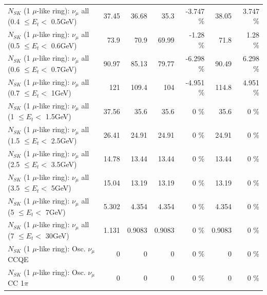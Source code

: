 \begin{table}
\begin{tabular}{| l | r | r | r  r | r  r |}
       $N_{SK}$ (1 $\mu$-like ring): $\nu_{\mu}$ all (0.4 $\leq E_{t} <$ 0.5GeV) &           37.45 &           36.68 &            35.3 &   -3.747 \%  &           38.05 &    3.747 \%  \\ 
       $N_{SK}$ (1 $\mu$-like ring): $\nu_{\mu}$ all (0.5 $\leq E_{t} <$ 0.6GeV) &            73.9 &            70.9 &           69.99 &    -1.28 \%  &            71.8 &     1.28 \%  \\ 
       $N_{SK}$ (1 $\mu$-like ring): $\nu_{\mu}$ all (0.6 $\leq E_{t} <$ 0.7GeV) &           90.97 &           85.13 &           79.77 &   -6.298 \%  &           90.49 &    6.298 \%  \\ 
         $N_{SK}$ (1 $\mu$-like ring): $\nu_{\mu}$ all (0.7 $\leq E_{t} <$ 1GeV) &             121 &           109.4 &             104 &   -4.951 \%  &           114.8 &    4.951 \%  \\ 
         $N_{SK}$ (1 $\mu$-like ring): $\nu_{\mu}$ all (1 $\leq E_{t} <$ 1.5GeV) &           37.56 &            35.6 &            35.6 &        0 \%  &            35.6 &        0 \%  \\ 
       $N_{SK}$ (1 $\mu$-like ring): $\nu_{\mu}$ all (1.5 $\leq E_{t} <$ 2.5GeV) &           26.41 &           24.91 &           24.91 &        0 \%  &           24.91 &        0 \%  \\ 
       $N_{SK}$ (1 $\mu$-like ring): $\nu_{\mu}$ all (2.5 $\leq E_{t} <$ 3.5GeV) &           14.78 &           13.44 &           13.44 &        0 \%  &           13.44 &        0 \%  \\ 
         $N_{SK}$ (1 $\mu$-like ring): $\nu_{\mu}$ all (3.5 $\leq E_{t} <$ 5GeV) &           15.04 &           13.19 &           13.19 &        0 \%  &           13.19 &        0 \%  \\ 
           $N_{SK}$ (1 $\mu$-like ring): $\nu_{\mu}$ all (5 $\leq E_{t} <$ 7GeV) &           5.302 &           4.354 &           4.354 &        0 \%  &           4.354 &        0 \%  \\ 
          $N_{SK}$ (1 $\mu$-like ring): $\nu_{\mu}$ all (7 $\leq E_{t} <$ 30GeV) &           1.131 &          0.9083 &          0.9083 &        0 \%  &          0.9083 &        0 \%  \\ 
\hline
\hline
                               $N_{SK}$ (1 $\mu$-like ring): Osc. $\nu_\mu$ CCQE &               0 &               0 &               0 &        0 \%  &               0 &        0 \%  \\ 
                          $N_{SK}$ (1 $\mu$-like ring): Osc. $\nu_\mu$ CC 1$\pi$ &               0 &               0 &               0 &        0 \%  &               0 &        0 \%  \\ 

\end{tabular}
\end{table}
